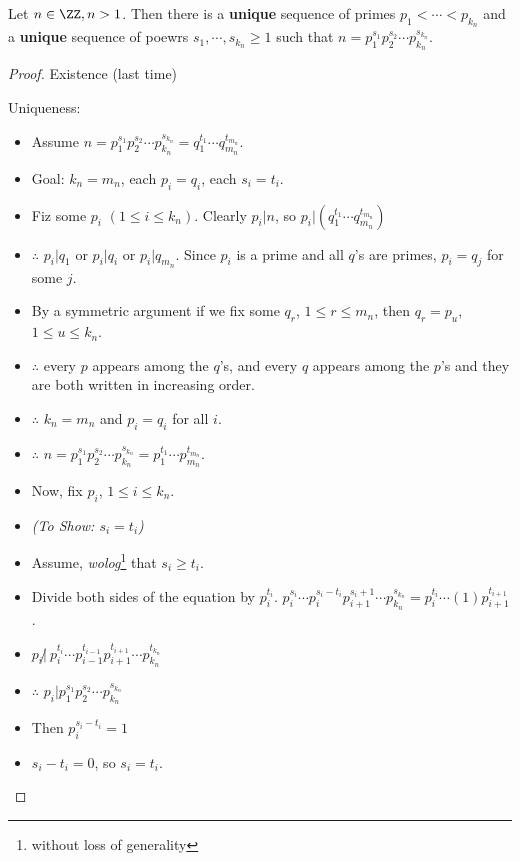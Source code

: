 \begin{theorem}
Let $n\in\ZZ, n>1$. Then there is a \textbf{unique} sequence of primes $p_1<\cdots<p_{k_n}$ and a \textbf{unique} sequence of poewrs $s_1,\cdots,s_{k_n} \ge 1$ such that $n=p_1^{s_1}p_2^{s_2}\cdots p_{k_n}^{s_{k_n}}$.
\end{theorem}
\begin{proof}
Existence (last time)

Uniqueness:

\begin{itemize}
\item Assume $n=p_1^{s_1}p_2^{s_2}\cdots p_{k_n}^{s_{k_n}}  = q_1^{t_1}\cdots q_{m_n}^{t_{m_n}}$.
\item Goal: $k_n=m_n$, each $p_i=q_i$, each $s_i=t_i$.
\item Fiz some $p_i$ $(1 \le i \le k_n)$. Clearly $p_i|n$, so $p_i|\left( q_1^{t_1}\cdots q_{m_n}^{t_{m_n}} \right)$
\item $\therefore$ $p_i|q_1$ or $p_i|q_i$ or $p_i|q_{m_n}$. Since $p_i$ is a prime and all $q$'s are primes, $p_i=q_j$ for some $j$.
\item By a symmetric argument if we fix some $q_r$, $1\le r\le m_n$, then $q_r=p_u$, $1 \le u \le k_n$.
\item $\therefore$ every $p$ appears among the $q$'s, and every $q$ appears among the $p$'s and they are both written in increasing order.
\item $\therefore$ $k_n=m_n$ and $p_i=q_i$ for all $i$.
\item $\therefore$ $n=p_1^{s_1}p_2^{s_2}\cdots p_{k_n}^{s_{k_n}} = p_1^{t_1}\cdots p_{m_n}^{t_{m_n}}$.
\item Now, fix $p_i$, $1\le i \le k_n$.
\item \emph{(To Show: $s_i=t_i$)}
\item Assume, \emph{wolog}\footnote{without loss of generality} that $s_i \ge t_i$.
\item Divide both sides of the equation by $p_i^{t_i}$. $p_i^{s_i}\cdots p_i^{s_i-t_i}p_{i+1}^{s_i+1}\cdots p_{k_n}^{s_{k_n}} = p_i^{t_i} \cdots (1)p_{i+1}^{t_{i+1}}$.
\item $p_i\not |\ p_i^{t_i} \cdots p_{i-1}^{t_{i-1}}p_{i+1}^{t_{i+1}} \cdots p_{k_n}^{t_{k_n}}$
\item $\therefore$ $p_i | p_1^{s_1}p_2^{s_2}\cdots p_{k_n}^{s_{k_n}}$
\item Then $p_i^{s_i-t_i} = 1$
\item $s_i-t_i = 0$, so $s_i = t_i$.
\end{itemize}
\end{proof}

